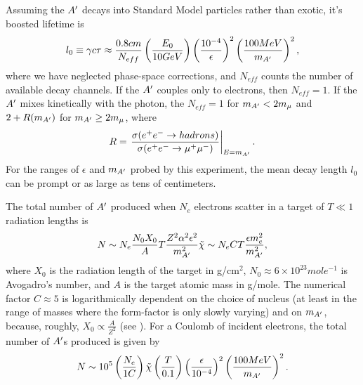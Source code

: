 Assuming the $A^\prime$ decays into Standard Model particles rather than exotic, it's boosted lifetime is
\begin{equation}
l_0 \equiv \gamma c\tau \approx \frac{0.8 cm}{N_{eff}} \left(\frac{E_0}{10 GeV}\right)\left(\frac{10^{-4}}{\epsilon}\right)^2\left(\frac{100 MeV}{m_{A^\prime}}\right)^2,
\end{equation}
where we have neglected phase-space corrections, and $N_{eff}$ counts the number of available decay channels.  If the $A^\prime$ couples only to electrons, then $N_{eff}=1$.  If the $A^\prime$ mixes kinetically with the photon, the $N_{eff}=1$ for $m_{A^\prime} < 2m_\mu$ and $2+R(m_{A^\prime})$ for $m_{A^\prime} \geq 2 m_\mu$, where \cite{eehadrons}
\begin{equation}
R  =\left. \frac{\sigma(e^+e^-\rightarrow hadrons)}{\sigma (e^+e^- \rightarrow \mu^+\mu^-)}\right|_{E=m_{A^\prime}} . 
\end{equation} 
For the ranges of $\epsilon$ and $m_{A^\prime}$ probed by this experiment, the mean decay length $l_0$ can be prompt or as large as tens of centimeters.  

The total number of $A^\prime$ produced when $N_e$ electrons scatter in a target of $T\ll 1 $ radiation lengths is
\begin{equation}
N\sim N_e\frac{N_0 X_0}{A}T\frac{Z^2\alpha^2\epsilon^2}{m_{A^\prime}^2}\tilde{\chi}\sim N_e C T \frac{\epsilon m_e^2}{m_{A^\prime}^2},
\end{equation}
where $X_0$ is the radiation length of the target in g/cm$^2$, $N_0 \approx 6\times 10^{23} mole^{-1}$ is Avogadro's number, and $A$ is the target atomic mass in g/mole.  The numerical factor $C\approx 5$ is logarithmically dependent on the choice of nucleus (at least in the range of masses where the form-factor is only slowly varying) and on $m_{A^\prime}$, because, roughly, $X_0 \propto \frac{A}{Z^2}$ (see \cite{Kim:1973he, Essig:2010xa,Bjorken:2009mm}).  For a Coulomb of incident
electrons, the total number of $A^\prime$s produced is given by
\begin{equation}
N\sim 10^5 \left(\frac{N_e}{1 C}\right)\tilde{\chi}\left(\frac{T}{0.1}\right)\left(\frac{\epsilon}{10^{-4}}\right)^2\left(\frac{100 MeV}{m_{A^\prime}}\right)^2.
\end{equation}

